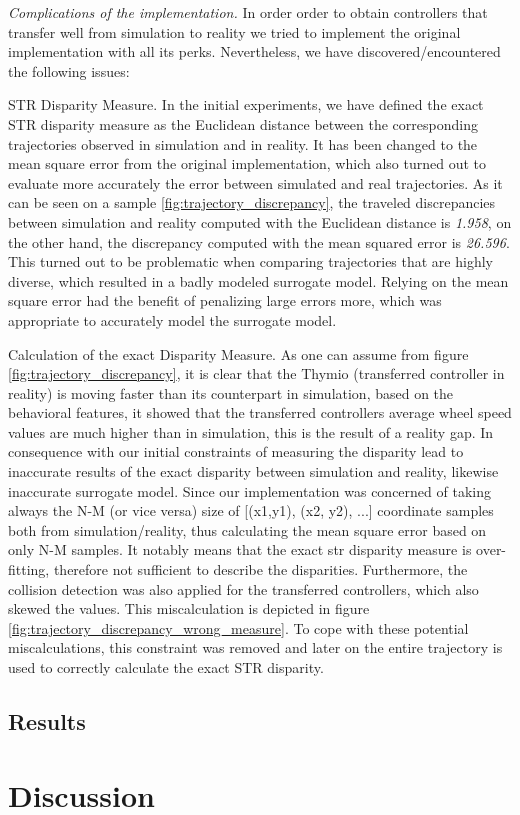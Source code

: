 \emph{Complications of the implementation.} In order order to obtain controllers that transfer well from simulation to reality we tried to implement the original implementation with all its perks. Nevertheless, we have discovered/encountered the following issues:

\begin{description}
	
    \item{STR Disparity Measure}. In the initial experiments, we have defined the exact STR disparity measure as the Euclidean distance between the corresponding trajectories observed in simulation and in reality. It has been changed to the mean square error from the original implementation, which also turned out to evaluate more accurately the error between simulated and real trajectories. As it can be seen on a sample \ref{fig:trajectory_discrepancy}, the traveled discrepancies between simulation and reality computed with the Euclidean distance is \textit{1.958}, on the other hand, the discrepancy computed with the mean squared error is \textit{26.596}. This turned out to be problematic when comparing trajectories that are highly diverse, which resulted in a badly modeled surrogate model. Relying on the mean square error had the benefit of penalizing large errors more, which was appropriate to accurately model the surrogate model. 
    
    \item{Calculation of the exact Disparity Measure}. As one can assume from figure \ref{fig:trajectory_discrepancy}, it is clear that the Thymio (transferred controller in reality) is moving faster than its counterpart in simulation, based on the behavioral features, it showed that the transferred controllers average wheel speed values are much higher than in simulation, this is the result of a reality gap. In consequence with our initial constraints of measuring the disparity lead to inaccurate results of the exact disparity between simulation and reality, likewise inaccurate surrogate model. Since our implementation was concerned of taking always the N-M (or vice versa) size of [(x1,y1), (x2, y2), ...] coordinate samples both from simulation/reality, thus calculating the mean square error based on only N-M samples. It notably means that the exact str disparity measure is over-fitting, therefore not sufficient to describe the disparities. Furthermore, the collision detection was also applied for the transferred controllers, which also skewed the values. This miscalculation is depicted in figure \ref{fig:trajectory_discrepancy_wrong_measure}. To cope with these potential miscalculations, this constraint was removed and later on the entire trajectory is used to correctly calculate the exact STR disparity.
	
\end{description}



\subsection{Results}




\section{Discussion}



